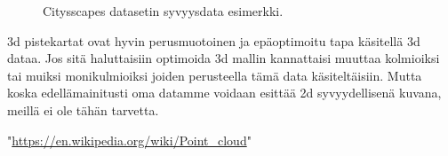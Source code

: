 \begin{figure}
\centering
{}
\caption[Tämä on lyhyt kuvateksti.]{Citysscapes datasetin syvyysdata esimerkki.}
\label{fig:depth}
\end{figure}

3d pistekartat ovat hyvin perusmuotoinen ja epäoptimoitu tapa käsitellä 3d dataa. Jos sitä haluttaisiin optimoida 3d mallin kannattaisi muuttaa kolmioiksi tai muiksi monikulmioiksi joiden perusteella tämä data käsiteltäisiin. Mutta koska edellämainitusti oma datamme voidaan esittää 2d syvyydellisenä kuvana, meillä ei ole tähän tarvetta.

    
"\url{https://en.wikipedia.org/wiki/Point_cloud}"

